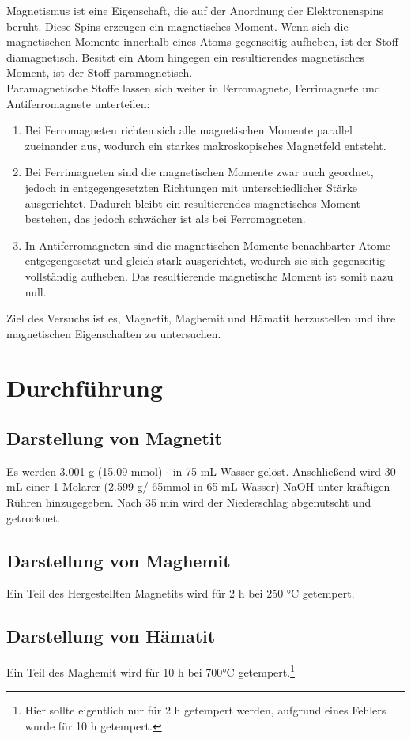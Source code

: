 \documentclass[12pt, a4paper]{article}
\begin{document}
{Magnetismus ist eine Eigenschaft, die auf der Anordnung der Elektronenspins beruht. Diese Spins erzeugen ein magnetisches Moment. Wenn sich die magnetischen Momente innerhalb
 eines Atoms gegenseitig aufheben, ist der Stoff diamagnetisch. Besitzt ein Atom hingegen ein resultierendes magnetisches Moment, ist der Stoff paramagnetisch.\\
\noindent
Paramagnetische Stoffe lassen sich weiter in Ferromagnete, Ferrimagnete und Antiferromagnete unterteilen:
\begin{enumerate}
    \item Bei Ferromagneten richten sich alle magnetischen Momente parallel zueinander aus, wodurch ein starkes makroskopisches Magnetfeld entsteht.
    \item Bei Ferrimagneten sind die magnetischen Momente zwar auch geordnet, jedoch in entgegengesetzten Richtungen mit unterschiedlicher Stärke ausgerichtet. Dadurch bleibt ein resultierendes magnetisches Moment bestehen, das jedoch schwächer ist als bei Ferromagneten.
    \item In Antiferromagneten sind die magnetischen Momente benachbarter Atome entgegengesetzt und gleich stark ausgerichtet, wodurch sie sich gegenseitig vollständig aufheben. Das resultierende magnetische Moment ist somit nazu null.
\end{enumerate}
\noindent
Ziel des Versuchs ist es, Magnetit, Maghemit und Hämatit herzustellen und ihre magnetischen Eigenschaften zu untersuchen. \cite{Skript}
}


\newpage
\section{Durchführung}
\subsection{Darstellung von Magnetit}
Es werden 3.001 g (15.09 mmol) $\cdot$ in 75 mL Wasser gelöst. Anschließend wird 30 mL einer 1 Molarer (2.599 g/ 65mmol in 65 mL Wasser) NaOH
unter kräftigen Rühren hinzugegeben. Nach 35 min wird der Niederschlag abgenutscht und getrocknet.

\subsection{Darstellung von Maghemit}
Ein Teil des Hergestellten Magnetits wird für 2 h bei 250 °C getempert.

\subsection{Darstellung von Hämatit}
Ein Teil des Maghemit wird für 10 h bei 700°C getempert.\footnote{Hier sollte eigentlich nur für 2 h getempert werden, aufgrund eines Fehlers wurde für 10 h getempert.}
\end{document}
